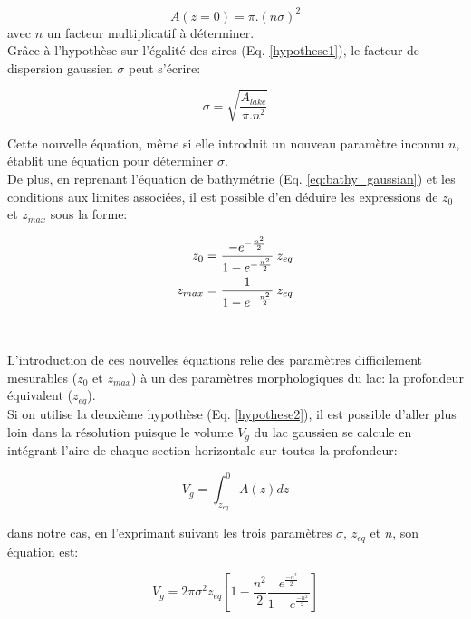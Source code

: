 \begin{equation}
A(z=0) = \pi.(n\sigma)^2
\end{equation}
avec $n$ un facteur multiplicatif à déterminer.\\

\noindent Grâce à l'hypothèse sur l'égalité des aires (Eq. \ref{hypothese1}), le facteur de dispersion gaussien $\sigma$ peut s'écrire:

\begin{equation}
 \sigma = \sqrt{\dfrac{A_{lake}}{\pi.n^{2}}}
\end{equation}

\noindent Cette nouvelle équation, même si elle introduit un nouveau paramètre inconnu $n$, établit une équation pour déterminer $\sigma$. \\

\noindent De plus, en reprenant l'équation de bathymétrie (Eq. \ref{eq:bathy_gaussian}) et les conditions aux limites associées, il est possible d'en déduire les expressions de $z_0$ et $z_{max}$ sous la forme:

\begin{align}
\label{eq:z0}
z_0 = \dfrac{-e^{-\frac{n^2}{2}}}{1-e^{-\frac{n^2}{2}}} \: z_{eq} \\
\bigskip
z_{max} = \frac{1}{1-e^{-\frac{n^2}{2}}} \: z_{eq}
\end{align}
~\\
~\\

\noindent L'introduction de ces nouvelles équations relie des paramètres difficilement mesurables ($z_{0}$ et $z_{max}$) à un des paramètres morphologiques du lac: la profondeur équivalent ($z_{eq}$).\\
Si on utilise la deuxième hypothèse (Eq. \ref{hypothese2}), il est possible d'aller plus loin dans la résolution puisque le volume $V_{g}$ du lac gaussien se calcule en intégrant l'aire de chaque section horizontale sur toutes la profondeur:

\begin{equation}
\label{eq:vol_gene}
V_{g} = \int_{z_{eq}}^0 A(z)dz
\end{equation}

\noindent dans notre cas, en l'exprimant suivant les trois paramètres $\sigma$, $z_{eq}$ et $n$, son équation est:

\begin{equation}
\label{eq:vol_gaussian_n}
V_{g} = 2\pi\sigma^2z_{eq}\left[1 - \dfrac{n^2}{2}\dfrac{e^{\frac{-n^2}{2}}}{1-e^{\frac{-n^2}{2}}}\right]
\end{equation}
~\\

